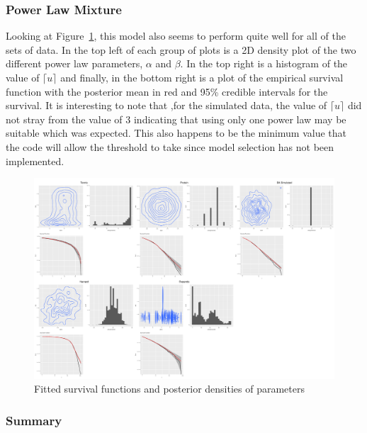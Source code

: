\documentclass[
]{article}
\begin{document}
\hypertarget{power-law-mixture}{%
\subsubsection{Power Law Mixture}\label{power-law-mixture}}

Looking at Figure~\ref{fig-plpl}, this model also seems to perform quite
well for all of the sets of data. In the top left of each group of plots
is a 2D density plot of the two different power law parameters,
\(\alpha\) and \(\beta\). In the top right is a histogram of the value
of \(\lceil u\rceil\) and finally, in the bottom right is a plot of the
empirical survival function with the posterior mean in red and 95\%
credible intervals for the survival. It is interesting to note that ,for
the simulated data, the value of \(\lceil u \rceil\) did not stray from
the value of 3 indicating that using only one power law may be suitable
which was expected. This also happens to be the minimum value that the
code will allow the threshold to take since model selection has not been
implemented.

\begin{figure}[H]

{\centering \includegraphics{proposal_files/figure-pdf/fig-plpl-1.pdf}

}

\caption{\label{fig-plpl}Fitted survival functions and posterior
densities of parameters}

\end{figure}

\hypertarget{summary}{%
\subsubsection{Summary}\label{summary}}
\end{document}
